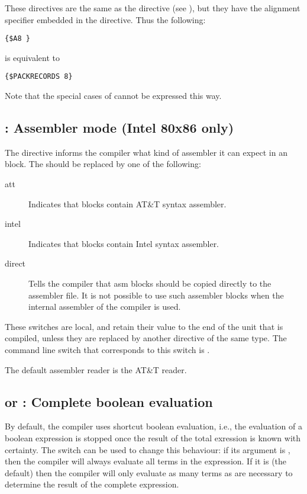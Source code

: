 These directives are the same as the  directive 
(see ), but they have the alignment specifier embedded in the
directive. Thus the following:
\begin{verbatim}
{$A8 }
\end{verbatim}
is equivalent to 
\begin{verbatim}
{$PACKRECORDS 8}
\end{verbatim}
Note that the special cases of  cannot be expressed this
way.

\subsection{ : Assembler mode (Intel 80x86 only)}
\label{se:AsmReader}


The  directive informs the compiler what kind of assembler
it can expect in an  block. The  should be replaced by one
of the following:
\begin{description}
\item [att\ ] Indicates that  blocks contain AT\&T syntax assembler.
\item [intel\ ] Indicates that  blocks contain Intel syntax
assembler.
\item [direct\ ] Tells the compiler that asm blocks should be copied
directly to the assembler file. It is not possible to use such assembler
blocks when the internal assembler of the compiler is used.
\end{description}
These switches are local, and retain their value to the end of the unit that
is compiled, unless they are replaced by another directive of the same type.
The command line switch that corresponds to this switch is .

The default assembler reader is the AT\&T reader.

\subsection{ or  : Complete boolean evaluation}

By default, the compiler uses shortcut boolean evaluation, i.e., the evaluation
of a boolean expression is stopped once the result of the total
exression is known with certainty. The  switch can be used
to change this behaviour: if its argument is , then the
compiler will always evaluate all terms in the expression. If it is
 (the default) then the compiler will only evaluate as many
terms as are necessary to determine the result of the complete expression.

